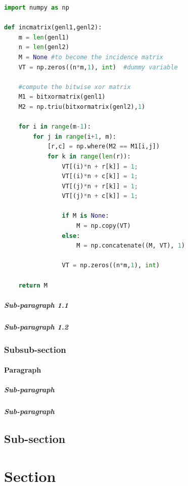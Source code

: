 {\footnotesize
\begin{lstlisting}[basicstyle=\linespread{0.8},language=Python, caption= Contoh potongan kode, label= kode1]
import numpy as np
    
def incmatrix(genl1,genl2):
    m = len(genl1)
    n = len(genl2)
    M = None #to become the incidence matrix
    VT = np.zeros((n*m,1), int)  #dummy variable
    
    #compute the bitwise xor matrix
    M1 = bitxormatrix(genl1)
    M2 = np.triu(bitxormatrix(genl2),1) 

    for i in range(m-1):
        for j in range(i+1, m):
            [r,c] = np.where(M2 == M1[i,j])
            for k in range(len(r)):
                VT[(i)*n + r[k]] = 1;
                VT[(i)*n + c[k]] = 1;
                VT[(j)*n + r[k]] = 1;
                VT[(j)*n + c[k]] = 1;
                
                if M is None:
                    M = np.copy(VT)
                else:
                    M = np.concatenate((M, VT), 1)
                
                VT = np.zeros((n*m,1), int)
    
    return M
\end{lstlisting}
}

\subparagraph{Sub-paragraph 1.1}

\lipsum[17-18]

\subparagraph{Sub-paragraph 1.2}

\lipsum[19-20]

\subsubsection{Subsub-section}

\lipsum[21-22]

\paragraph{Paragraph}

\subparagraph{Sub-paragraph}

\subparagraph{Sub-paragraph}

\subsection{Sub-section}

\lipsum[25-26]

\section{Section}

